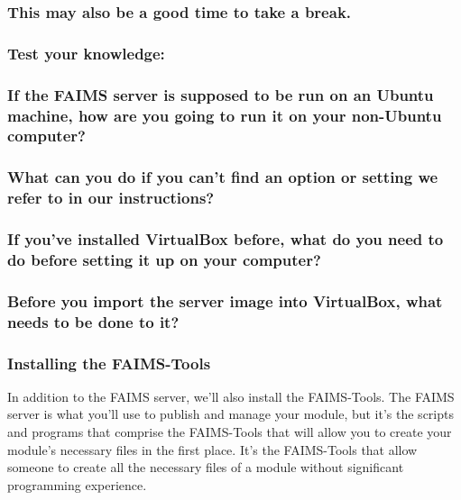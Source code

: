 \subsubsection[this-may-also-be-a-good-time-to-take-a-break.]{This may also be a good time to take a break.}

\subsubsection[test-your-knowledge]{Test your knowledge:}

\subsubsection[if-the-faims-server-is-supposed-to-be-run-on-an-ubuntu-machine-how-are-you-going-to-run-it-on-your-non-ubuntu-computer]{If the FAIMS server is supposed to be run on an Ubuntu machine, how are you going to run it on your non-Ubuntu computer?}

\subsubsection[what-can-you-do-if-you-cant-find-an-option-or-setting-we-refer-to-in-our-instructions]{What can you do if you can't find an option or setting we refer to in our instructions?}

\subsubsection[if-youve-installed-virtualbox-before-what-do-you-need-to-do-before-setting-it-up-on-your-computer]{If you've installed VirtualBox before, what do you need to do before setting it up on your computer?}

\subsubsection[before-you-import-the-server-image-into-virtualbox-what-needs-to-be-done-to-it]{Before you import the server image into VirtualBox, what needs to be done to it?\crlf
}

\subsubsection[installing-the-faims-tools]{Installing the FAIMS-Tools}

In addition to the FAIMS server, we'll also install the FAIMS-Tools. The FAIMS server is what you'll use to publish and manage your module, but it's the scripts and programs that comprise the FAIMS-Tools that will allow you to create your module's necessary files in the first place. It's the FAIMS-Tools that allow someone to create all the necessary files of a module without significant programming experience.

